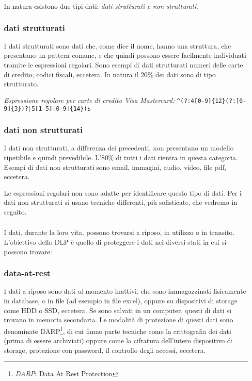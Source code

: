     In natura esistono due tipi dati: \textit{dati strutturati e non strutturati}.
        \subsubsection{dati strutturati}
            I dati strutturati sono dati che, come dice il nome, hanno una struttura, che presentano un pattern comune, e che 
            quindi possono essere facilmente individuati tramite le espressioni regolari. 
            Sono esempi di dati strutturati numeri delle carte di credito, codici fiscali, eccetera.
            In natura il 20\% dei dati sono di tipo strutturato. 
    
            \begin{center} 
                \textit{Espressione regolare per carte di credito Visa Mastercard:}
                \verb/^(?:4[0-9]{12}(?:[0-9]{3})?|5[1-5][0-9]{14})$/ 
            \end{center}

        \subsubsection{dati non strutturati}
            I dati non strutturati, a differenza dei precedenti, non presentano un modello ripetibile
            e quindi prevedibile. L'80\% di tutti i dati rientra in questa categoria. Esempi di dati non 
            strutturati sono email, immagini, audio, video, file pdf, eccetera. 
    
    Le espressioni regolari non sono adatte per identificare questo tipo di dati. %
    Per i dati non strutturati si usano tecniche differenti, più sofisticate, che vedremo in seguito. 

    \subsubsection*{}
    I dati, durante la loro vita, possono trovarsi a riposo, in utilizzo o in transito.
    L'obiettivo della DLP è quello di proteggere i dati nei diversi stati in cui si possono trovare:
    \cite{SANS1}

    \subsubsection{data-at-rest}
        I dati a riposo sono dati al momento inattivi, che sono immagazzinati fisicamente in database,
        o in file (ad esempio in file excel), oppure su dispositivi di storage come HDD o SSD, eccetera.
        Se sono salvati in un computer, questi di dati si trovano in memoria secondaria.
        Le modalità di protezione di questi dati sono denominate DARP\footnote{\textit{DARP}: Data At Rest Protection}, 
        di cui fanno parte tecniche come la crittografia dei dati (prima di essere archiviati) oppure come la cifratura
        dell'intero dispositivo di storage, protezione con password, il controllo degli accessi, eccetera.

